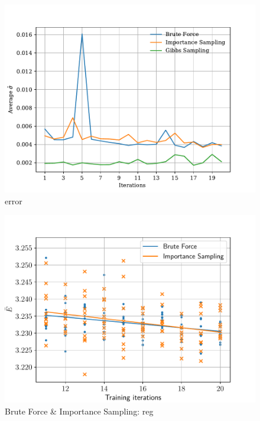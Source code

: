 \documentclass[%
oneside,                 %
final,                   %
10pt]{article}
\begin{document}
\begin{figure}[!h]
        \centering 
         \includegraphics[scale=0.8]{../Results/sim_12/error_interacting.pdf} 
        \caption{error }
        \label{fig:inter_error}   
\end{figure}  

\begin{figure}[!h]
        \centering 
         \includegraphics[scale=0.8]{../Results/sim_12/regression/Regression_BF_IS.pdf} 
        \caption{Brute Force \& Importance Sampling:  reg }
        \label{fig:reg_BFIS}   
\end{figure}  
\end{document}
